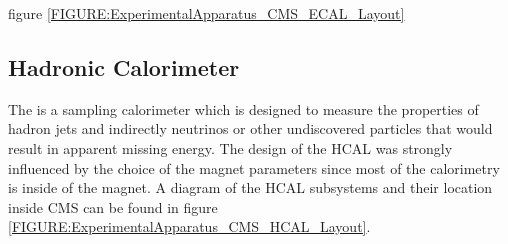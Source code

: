 figure \ref{FIGURE:ExperimentalApparatus_CMS_ECAL_Layout}

% 

\subsection{Hadronic Calorimeter}
\label{SUBSECTION:ExperimentalApparatus_CMS_HCAL}


The  is a sampling calorimeter which is designed to measure the properties of hadron jets and indirectly neutrinos or other undiscovered particles that would result in apparent missing energy\cite{ARTICLE:CMSTechnicalProposal}. The design of the \gls{HCAL} was strongly influenced by the choice of the magnet parameters since most of the calorimetry is inside of the magnet. A diagram of the \gls{HCAL} subsystems and their location inside \gls{CMS} can be found in figure \ref{FIGURE:ExperimentalApparatus_CMS_HCAL_Layout}.

